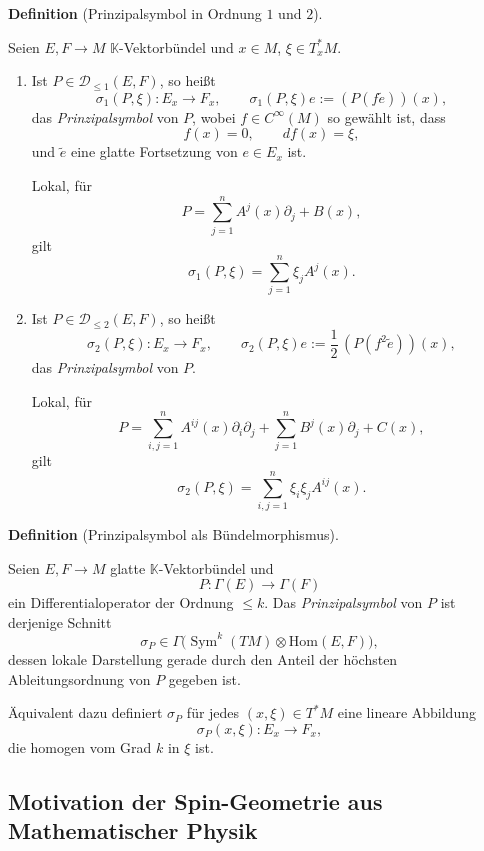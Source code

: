 \documentclass[10pt, letterpaper]{article}
\newcommand{\Hom}{\mathrm{Hom}}
\newcommand{\CustomHeading}[3]{%
  \par\medskip\noindent%
  \textbf{#1 #2} \textnormal{(#3)}.\enskip%
}
\newenvironment{DEF}[2]{\CustomHeading{Definition}{#1}{#2}}{}
\begin{document}
\begin{DEF}{}{Prinzipalsymbol in Ordnung \(1\) und \(2\)}
Seien \(E,F\to M\) \(\mathbb{K}\)-Vektorbündel und \(x\in M\), \(\xi\in T_x^*M\).

\begin{enumerate}
    \item Ist \(P\in \mathscr D_{\le 1}(E,F)\), so heißt
    \[
    \sigma_1(P,\xi):E_x\to F_x,
    \qquad
    \sigma_1(P,\xi)e:=(P(f\widetilde e))(x),
    \]
    das \emph{Prinzipalsymbol} von \(P\), wobei \(f\in C^\infty(M)\) so gewählt ist, dass
    \[
    f(x)=0,\qquad df(x)=\xi,
    \]
    und \(\widetilde e\) eine glatte Fortsetzung von \(e\in E_x\) ist.

    Lokal, für
    \[
    P=\sum_{j=1}^n A^j(x)\partial_j + B(x),
    \]
    gilt
    \[
    \sigma_1(P,\xi)=\sum_{j=1}^n \xi_j A^j(x).
    \]

    \item Ist \(P\in \mathscr D_{\le 2}(E,F)\), so heißt
    \[
    \sigma_2(P,\xi):E_x\to F_x,
    \qquad
    \sigma_2(P,\xi)e:=\frac12\,(P(f^2\widetilde e))(x),
    \]
    das \emph{Prinzipalsymbol} von \(P\).

    Lokal, für
    \[
    P=\sum_{i,j=1}^n A^{ij}(x)\partial_i\partial_j + \sum_{j=1}^n B^j(x)\partial_j + C(x),
    \]
    gilt
    \[
    \sigma_2(P,\xi)=\sum_{i,j=1}^n \xi_i\xi_j A^{ij}(x).
    \]
\end{enumerate}
\end{DEF}

\begin{DEF}{}{Prinzipalsymbol als Bündelmorphismus}
Seien \(E,F\to M\) glatte \(\mathbb{K}\)-Vektorbündel und
\[
P:\Gamma(E)\to \Gamma(F)
\]
ein Differentialoperator der Ordnung \(\le k\). Das \emph{Prinzipalsymbol} von \(P\)
ist derjenige Schnitt
\[
\sigma_P\in \Gamma\bigl(\operatorname{Sym}^k(TM)\otimes \Hom(E,F)\bigr),
\]
dessen lokale Darstellung gerade durch den Anteil der höchsten Ableitungsordnung
von \(P\) gegeben ist.

Äquivalent dazu definiert \(\sigma_P\) für jedes \((x,\xi)\in T^*M\) eine lineare
Abbildung
\[
\sigma_P(x,\xi):E_x\to F_x,
\]
die homogen vom Grad \(k\) in \(\xi\) ist.
\end{DEF}



\pagebreak


\subsection{Motivation der Spin-Geometrie aus Mathematischer Physik}
\end{document}
